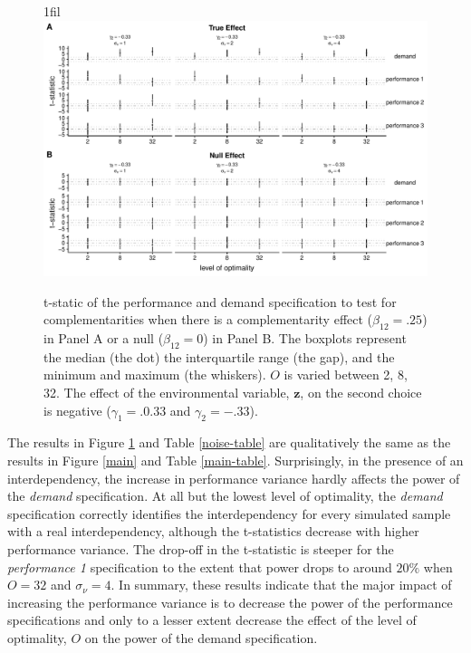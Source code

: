 \documentclass[12pt]{article}
\makeatletter
\newcommand*{\centerfloat}{%
  \parindent \z@
  \leftskip \z@ \@plus 1fil \@minus \textwidth
  \rightskip\leftskip
  \parfillskip \z@skip}
\makeatother
\begin{document}
\begin{figure}
\centerfloat
\includegraphics[width=450px]{figure-latex/noise_new_plot.pdf}
\caption[Error Rate and Power with Increasing Levels of Variability in Performance]
{\label{noise} t-static of the performance and demand specification to test
for complementarities when there is a complementarity effect ($\beta_{12} = .25$)
in Panel A or a null ($\beta_{12} = 0$) in Panel B. The boxplots represent the median (the dot) the interquartile range (the gap), and the minimum and maximum (the whiskers). $O$ is varied between 2, 8, 32. The effect of the environmental variable, $\mathbf{z}$, on the second choice is negative ($\gamma_1 = .0.33$ and $\gamma_2 = -.33$).}
\end{figure}



The results in Figure \ref{noise} and Table \ref{noise-table} are qualitatively the same as the results in Figure \ref{main} and Table \ref{main-table}. Surprisingly, in the presence of an interdependency, the increase in performance variance hardly affects the power of the \emph{demand} specification. At all but the lowest level of optimality, the \emph{demand} specification correctly identifies the interdependency for every simulated sample with a real interdependency, although the t-statistics decrease with higher performance variance. The drop-off in the t-statistic is steeper for the \emph{performance 1} specification to the extent that power drops to around \(20\%\) when \(O = 32\) and \(\sigma_{\nu} = 4\). In summary, these results indicate that the major impact of increasing the performance variance is to decrease the power of the performance specifications and only to a lesser extent decrease the effect of the level of optimality, $O$ on the power of the demand specification.
\end{document}
